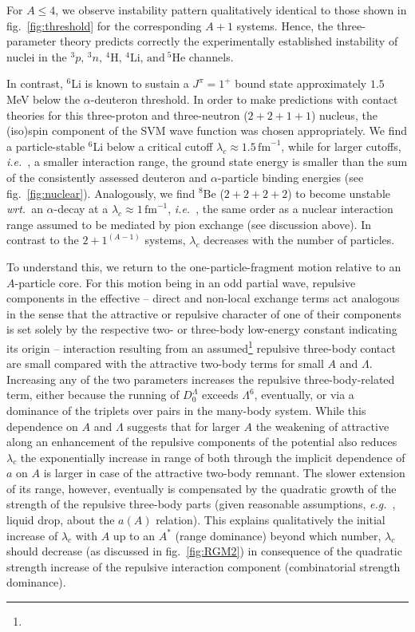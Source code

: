 \documentclass[preprint,12pt]{elsarticle}
\newcommand{\lc}{\ensuremath{\lambda_c}}
\newcommand{\fm}{\ensuremath{\,\text{fm}^{-1}}}
\newcommand{\abb}{\ensuremath{2\!+\!1^{(A-1)}}}
\newcommand{\wrt}{\textit{wrt.}~}
\newcommand{\eg}{\textit{e.g.}~}
\newcommand{\ie}{\textit{i.e.}~}
\newcommand{\figref}[1]{fig.~\ref{#1}}
\begin{document}
For $A\le 4$, we observe instability pattern qualitatively identical to
those shown in \figref{fig:threshold} for the corresponding $A+1$ systems.
Hence, the three-parameter theory predicts correctly the experimentally
established instability of nuclei in the
$^3p,\,^3n,\,^4\text{H},\,^4\text{Li},\,\text{and}~^5\text{He}$ channels.

In contrast, $^6$Li is known to sustain a $J^\pi=1^+ $ bound state
approximately $1.5~$MeV below the $\alpha$-deuteron threshold.
In order to make predictions with contact theories for this
three-proton and three-neutron ($2+2+1+1$) nucleus, the (iso)spin component of the SVM
wave function was chosen appropriately.
We find a particle-stable $^6$Li below a critical cutoff
$\lc\approx1.5\fm$, while for larger cutoffs,
\ie, a smaller interaction range, the ground state energy is
smaller than the sum of the consistently assessed deuteron and $\alpha$-particle binding
energies (see \figref{fig:nuclear}).
Analogously, we find $^8$Be ($2+2+2+2$) to become unstable \wrt an $\alpha$-decay at a
$\lc\approx 1\fm$, \ie, the same order as a nuclear interaction
range assumed to be mediated by pion exchange (see discussion above).
In contrast to the $\abb$ systems, $\lc$ decreases with the number of particles.

To understand this, we return to the one-particle-fragment motion relative to an $A$-particle core. 
For this motion being in an odd partial wave, repulsive components in
the effective -- direct and non-local exchange terms act analogous in the sense that the attractive
or repulsive character of one of their components is set solely by the respective two- or three-body
low-energy constant indicating its origin -- interaction resulting from an assumed\footnote{} repulsive
three-body contact are small compared with the attractive two-body terms for small $A$ and $\Lambda$.
Increasing any of the two parameters increases the repulsive three-body-related term, either because
the running of $D_0^\Lambda$ exceeds $\Lambda^6$, eventually, or via a dominance of the triplets over
pairs in the many-body system.
While this dependence on $A$ and $\Lambda$ suggests that for larger $A$ the weakening of attractive along
an enhancement of the repulsive components of the potential also reduces $\lc$ the exponentially
increase in range of both through the implicit dependence of $a$ on $A$ is larger in case of the
attractive two-body remnant. The slower extension of its range, however, eventually is compensated by
the quadratic growth of the strength of the repulsive three-body parts (given reasonable assumptions, \eg, liquid drop,
about the $a(A)$ relation). 
This explains qualitatively the initial increase of $\lc$ with $A$ up to an $A^*$ (range dominance) beyond which
number, $\lc$ should decrease (as discussed in \figref{fig:RGM2}) in consequence of the quadratic strength
increase of the repulsive interaction component (combinatorial strength dominance).
\end{document}
